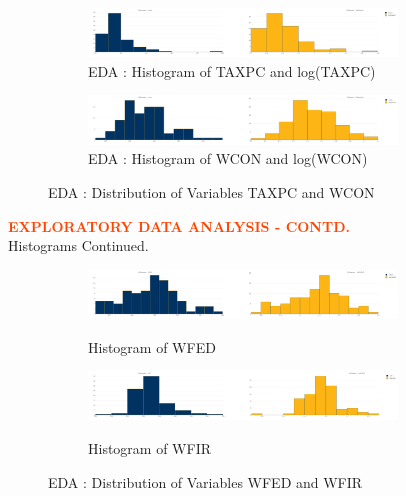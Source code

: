 \begin{figure}[!ht]
	\begin{subfigure}[b]{1.0\textwidth}
		\centering
		\includegraphics[width=0.9\textwidth,height=0.30\textheight]{images/EDA_histograms_taxpc.jpg}
		\caption{EDA : Histogram of TAXPC and log(TAXPC)}
		\label{fig:EDA Histogram TAXPC}
	\end{subfigure}\vspace{3mm}%
	
	\begin{subfigure}[b]{1.0\textwidth}
		\centering
		\includegraphics[width=0.9\textwidth,height=0.30\textheight]{images/EDA_histograms_wcon.jpg}
		\caption{EDA : Histogram of WCON and log(WCON)}
		\label{fig:EDA Histogram WCON}
	\end{subfigure}
	\label{fig:TAXPC and WCON Histogram}
	\caption{EDA : Distribution of Variables TAXPC and WCON}
\end{figure}

\pagebreak

\textbf{\textcolor{OrangeRed}{EXPLORATORY DATA ANALYSIS - CONTD.}}\\

Histograms Continued.\\

\begin{figure}[!ht]
	\begin{subfigure}[b]{1.0\textwidth}
		\centering
		\includegraphics[width=0.9\textwidth,height=0.30\textheight]{images/EDA_histograms_wfed.jpg}
		\label{fig:EDA Histogram WFED}
		\caption{Histogram of WFED}
	\end{subfigure}\vspace{3mm}%
	
	\begin{subfigure}[b]{1.0\textwidth}
		\centering
		\includegraphics[width=0.9\textwidth,height=0.30\textheight]{images/EDA_histograms_wfir.jpg}
		\label{fig:EDA Histogram WFIR}
		\caption{Histogram of WFIR}
	\end{subfigure}
	\label{fig:WFED and WFIR Histogram}
	\caption{EDA : Distribution of Variables WFED and WFIR}
\end{figure}

